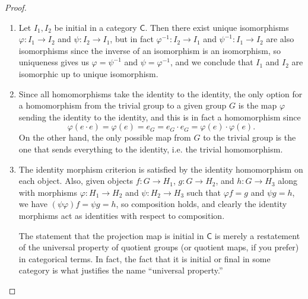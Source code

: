 \documentclass[12pt]{article}
\theoremstyle{definition}
\begin{document}
\begin{proof}\
	\begin{enumerate}[label=(\alph*)]
		\item Let $I_1, I_2$ be initial in a category $\mathsf{C}$.
		      Then there exist unique isomorphisms $\varphi: I_1 \to I_2$ and $\psi: I_2 \to I_1$, but in fact $\varphi^{-1} : I_2 \to I_1$ and $\psi^{-1} : I_1 \to I_2$ are also isomorphisms since the inverse of an isomorphism is an isomorphism, so uniqueness gives us $\varphi = \psi^{-1}$ and $\psi = \varphi^{-1}$, and we conclude that $I_1$ and $I_2$ are isomorphic up to unique isomorphism.
		\item Since all homomorphisms take the identity to the identity, the only option for a homomorphism from the trivial group to a given group $G$ is the map $\varphi$ sending the identity to the identity, and this is in fact a homomorphism since \begin{equation*}
			      \varphi(e \cdot e) = \varphi(e) = e_G = e_G \cdot e_G = \varphi(e)\cdot\varphi(e).
		      \end{equation*}
		      On the other hand, the only possible map from $G$ to the trivial group is the one that sends everything to the identity, i.e. the trivial homomorphism.
		\item The identity morphism criterion is satisfied by the identity homomorphism on each object.
		      Also, given objects $f : G \to H_1$, $g : G \to H_2$, and $h : G \to H_3$ along with morphisms $\varphi : H_1 \to H_2$ and $\psi : H_2 \to H_3$ such that $\varphi f = g$ and $\psi g = h$, we have $(\psi\varphi) f = \psi g = h$, so composition holds, and clearly the identity morphisms act as identities with respect to composition.

		      The statement that the projection map is initial in $\mathsf{C}$ is merely a restatement of the universal property of quotient groups (or quotient maps, if you prefer) in categorical terms.
		      In fact, the fact that it is initial or final in some category is what justifies the name ``universal property.''
	\end{enumerate}
\end{proof}
\end{document}
